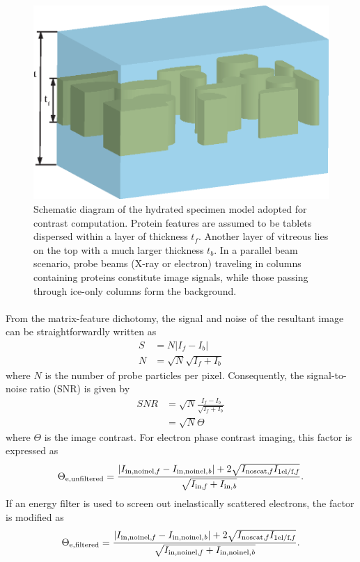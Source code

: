 \documentclass[review]{elsarticle}
\newcommand\innoinelb{\textup{\scriptsize{in,noinel,\textit b}}}
\newcommand\inb{\textup{\scriptsize{in,\textit b}}}
\newcommand\noscatf{\textup{\scriptsize{noscat,\textit f}}}
\newcommand\selff{\textup{\scriptsize{1el/f,\textit f}}}
\newcommand\innoinelf{\textup{\scriptsize{in,noinel,\textit f}}}
\newcommand\inff{\textup{\scriptsize{in,\textit f}}}
\begin{document}
\begin{figure}[htbp]
\begin{center}
\includegraphics{contrast_scheme.eps}
\caption{Schematic diagram of the hydrated specimen model adopted for contrast computation. Protein features are assumed to be tablets dispersed within a layer of thickness $t_f$. Another layer of vitreous lies on the top with a much larger thickness $t_b$. In a parallel beam scenario, probe beams (X-ray or electron) traveling in columns containing proteins constitute image signals, while those passing through ice-only columns form the background. }
\label{fig:contrast_scheme}
\end{center}
\end{figure}

\paragraph{} From the matrix-feature dichotomy, the signal and noise of the resultant image can be straightforwardly written as 
\begin{align}
S &= N|I_f-I_b| \\
N &= \sqrt{N}\sqrt{I_f+I_b}
\end{align}
where $N$ is the number of probe particles per pixel. Consequently, the signal-to-noise ratio (SNR) is given by \cite{Sun:2015fr}
\begin{equation}
\begin{aligned}
\textit{SNR} &= \sqrt{N}\frac{I_f-I_b}{\sqrt{I_f+I_b}} \\ &= \sqrt{N}\Theta
\end{aligned}
\end{equation}
where $\Theta$ is the image contrast. For electron phase contrast imaging, this factor is expressed as
\begin{equation}
\Theta_{\mathrm{e,unfiltered}} = \frac{|I_{\innoinelf}-I_{\innoinelb}|+2\sqrt{I_{\noscatf}I_{\selff}}}{\sqrt{I_{\inff}+I_{\inb}}}.
\end{equation}
If an energy filter is used to screen out inelastically scattered electrons, the factor is modified as
\begin{equation}
\Theta_{\mathrm{e,filtered}} = \frac{|I_{\innoinelf}-I_{\innoinelb}|+2\sqrt{I_{\noscatf}I_{\selff}}}{\sqrt{I_{\innoinelf}+I_{\innoinelb}}}.
\end{equation}
\end{document}
